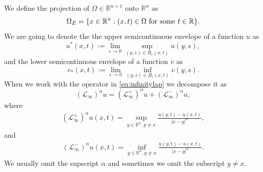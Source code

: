 \documentclass[11pt]{article}
\newcommand{\R}{\mathbb{R}}
\providecommand{\Linf}{\mathcal{L}_{\infty}}
\providecommand{\Lpos}{\mathcal{L}_{\infty}^+}
\providecommand{\Lneg}{\mathcal{L}_{\infty}^-}
\providecommand{\Rn}{\mathbb{R}^n}
\providecommand{\Rnn}{\mathbb{R}^{n+1}}
\providecommand{\On}{\Omega_E}
\providecommand{\Oe}{\Omega_{E}^{t_1,t_2}}
\numberwithin{equation}{section}
\theoremstyle{definition}
\begin{document}
We define the projection of $\Omega \in \Rnn$ onto $\Rn$ as
\begin{equation}\label{eq:projx}
    \On = \{x \in \Rn:(x,t) \in \Omega \textup{ for some } t \in \R \}.
\end{equation}
We are going to denote the the upper semicontinuous envelope of a function $u$ as
\begin{equation}\label{eq:u_upp}
    u^*(x,t) := \lim_{\epsilon \to 0} \sup_{(y,s) \in B_{\epsilon}(x,t)} u(y,s),
\end{equation}
and the lower semicontinuous envelope of a function $v$ as
\begin{equation}\label{eq:u_low}
    v_*(x,t) := \lim_{\epsilon \to 0} \inf_{(y,s) \in B_{\epsilon}(x,t)} v(y,s).
\end{equation}
When we work with the operator in \eqref{eq:infinitylap} we decompose it as
$$
(\Linf)^{\alpha} u = (\Lpos)^\alpha u + (\Lneg)^{\alpha} u,
$$
where
\begin{align*}
(\Lpos)^\alpha u(x,t) = \sup_{y \in \Rn, y \neq x} \frac{u(y,t)-u(x,t)}{|x-y|^{\alpha}},
\end{align*}
and
\begin{align*}
(\Lneg)^\alpha u(x,t) = \inf_{y \in \Rn, y \neq x} \frac{u(y,t)-u(x,t)}{|x-y|^{\alpha}}.
\end{align*}
 We usually omit the supscript $\alpha$ and sometimes we omit the subscript $y \neq x$.

 

\end{document}
